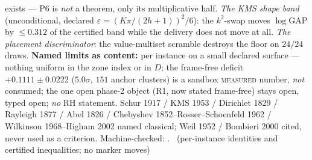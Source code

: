 \documentclass[11pt,a4paper]{article}
\theoremstyle{definition}
\begin{document}
exists --- P6 is \emph{not} a theorem, only its multiplicative half.
\emph{The KMS shape band} (unconditional, declared
$\varepsilon=(K\pi/(2h+1))^2/6$): the $k^2$-swap moves
$\log\mathrm{GAP}$ by $\le0.312$ of the certified band while the
delivery does not move at all. \emph{The placement discriminator}: the
value-multiset scramble destroys the floor on $24/24$ draws.
\textbf{Named limits as content:} per instance on a small declared
surface --- nothing uniform in the zone index or in $D$; the
frame-free deficit $+0.1111\pm0.0222$ ($5.0\sigma$, $151$ anchor
clusters) is a sandbox \textsc{measured} number, \emph{not} consumed;
the one open phase-2 object (R1, now stated frame-free) stays open,
typed open; \emph{no} RH statement.
Schur 1917 / KMS 1953 / Dirichlet 1829 / Rayleigh 1877 / Abel 1826 /
Chebyshev 1852--Rosser--Schoenfeld 1962 / Wilkinson 1968--Higham 2002
named classical; Weil 1952 / Bombieri 2000 cited, never used as a
criterion.
Machine-checked:
.
\mE\ (per-instance identities and certified inequalities; no marker moves)
\end{document}
